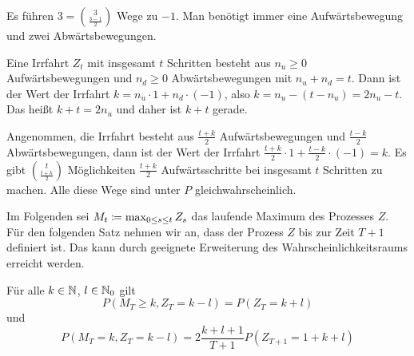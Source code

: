 \documentclass[a4paper,twoside,DIV15,BCOR12mm]{scrbook}
\begin{document}
\begin{bemerkung}
Es führen $3 = \binom{3}{\frac{3-1}{2}}$ Wege zu $-1$. Man benötigt immer eine Aufwärtsbewegung und zwei Abwärtsbewegungen.
\begin{center}
\end{center}
Eine Irrfahrt $Z_t$ mit insgesamt $t$ Schritten besteht aus $n_u\ge 0$ Aufwärtsbewegungen und $n_d\ge 0$ Abwärtsbewegungen mit $n_u + n_d = t$. Dann ist der Wert der Irrfahrt $k = n_u \cdot 1 + n_d \cdot (-1)$, also $k = n_u - (t-n_u) = 2n_u - t$.
Das heißt $k+t = 2n_u$ und daher ist $k+t$ gerade.

Angenommen, die Irrfahrt besteht aus $\frac{t+k}2$ Aufwärtsbewegungen und $\frac{t-k}2$ Abwärtsbewegungen, dann ist der Wert der Irrfahrt $\frac{t+k}2\cdot 1 + \frac{t-k}2\cdot (-1) = k$. Es gibt $\binom{t}{\frac{t+k}2}$ Möglichkeiten $\frac{t+k}2$ Aufwärtsschritte bei insgesamt $t$ Schritten zu machen. Alle diese Wege sind unter $P$ gleichwahrscheinlich.
\end{bemerkung}

Im Folgenden sei $M_t \da \max_{0\le s\le t} Z_s$ das laufende Maximum des Prozesses $Z$. Für den folgenden Satz nehmen wir an, dass der Prozess $Z$ bis zur Zeit $T+1$ definiert ist. Das kann durch geeignete Erweiterung des Wahrscheinlichkeitsraums erreicht werden.

\begin{satz}[Spiegelungsprinzip]
\label{satz:2.11.3}
Für alle $k\in \mathbb{N}$, $l\in \mathbb{N}_0$ gilt 
\[
P(M_T\ge k, Z_T=k-l) = P(Z_T=k+l)
\]
und
\[
P(M_T = k , Z_T = k-l) = 2 \frac{k+l+1}{T+1} P (Z_{T+1} = 1 + k + l)
\]
\end{satz}
\end{document}
